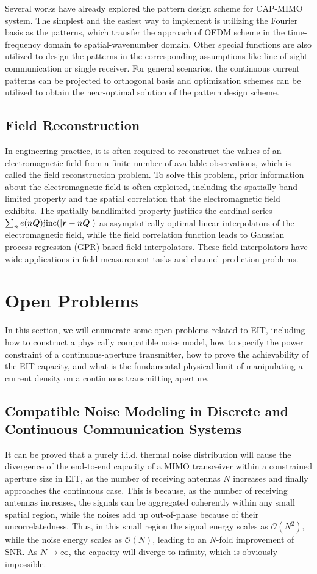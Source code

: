 \documentclass[journal,twocolumn]{IEEEtran}
\begin{document}
Several works have already explored the pattern design scheme for CAP-MIMO system. The simplest and the easiest way to implement is utilizing the Fourier basis as the patterns, which transfer the approach of OFDM scheme in the time-frequency domain to spatial-wavenumber domain. Other special functions are also utilized to design the patterns in the corresponding assumptions like line-of sight communication or single receiver. For general scenarios, the continuous current patterns can be projected to orthogonal basis and optimization schemes can be utilized to obtain the near-optimal solution of the pattern design scheme.

\subsection{Field Reconstruction}
In engineering practice, it is often required to reconstruct the values of an electromagnetic field from a finite number of available observations, which is called the field reconstruction problem. 
To solve this problem, prior information about the electromagnetic field is often exploited, including the spatially band-limited property and the spatial correlation that the electromagnetic field exhibits. 
The spatially bandlimited property justifies the cardinal series $\sum_n e(n{\bm Q}) {\rm jinc}(|{\bm r}-n{\bm Q}|)$ as asymptotically optimal linear interpolators of the electromagnetic field, while the field correlation function leads to Gaussian process regression (GPR)-based field interpolators. 
These field interpolators have wide applications in field measurement tasks and channel prediction problems. 

\section{Open Problems}
In this section, we will enumerate some open problems related to EIT, including how to construct a physically compatible noise model, how to specify the power constraint of a continuous-aperture transmitter, how to prove the achievability of the EIT capacity, and what is the fundamental physical limit of manipulating a current density on a continuous transmitting aperture. 

\subsection{Compatible Noise Modeling in Discrete and Continuous Communication Systems}
It can be proved that a purely i.i.d. thermal noise distribution will cause the divergence of the end-to-end capacity of a MIMO transceiver within a constrained aperture size in EIT, as the number of receiving antennas $N$ increases and finally approaches the continuous case. 
This is because, as the number of receiving antennas increases, the signals can be aggregated coherently within any small spatial region, while the noises add up out-of-phase because of their uncorrelatedness. 
Thus, in this small region the signal energy scales as $\mathcal{O}(N^2)$, while the noise energy scales as $\mathcal{O}(N)$, leading to an $N$-fold improvement of SNR. As $N\to\infty$, the capacity will diverge to infinity, which is obviously impossible.  
\end{document}
